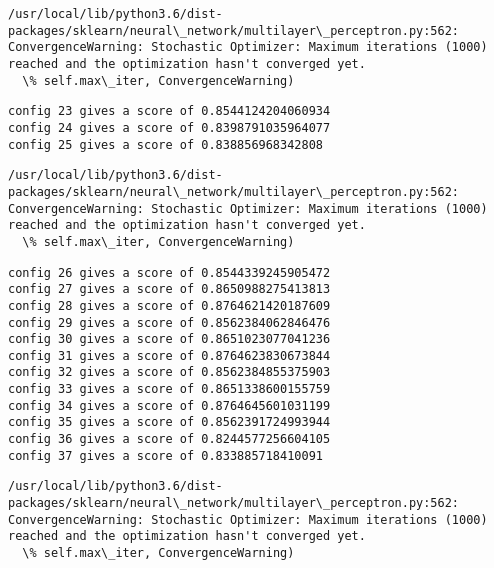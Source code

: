 \documentclass[11pt]{article}
\begin{document}
    \begin{Verbatim}[commandchars=\\\{\}]
/usr/local/lib/python3.6/dist-packages/sklearn/neural\_network/multilayer\_perceptron.py:562: ConvergenceWarning: Stochastic Optimizer: Maximum iterations (1000) reached and the optimization hasn't converged yet.
  \% self.max\_iter, ConvergenceWarning)

    \end{Verbatim}

    \begin{Verbatim}[commandchars=\\\{\}]
config 23 gives a score of 0.8544124204060934
config 24 gives a score of 0.8398791035964077
config 25 gives a score of 0.838856968342808

    \end{Verbatim}

    \begin{Verbatim}[commandchars=\\\{\}]
/usr/local/lib/python3.6/dist-packages/sklearn/neural\_network/multilayer\_perceptron.py:562: ConvergenceWarning: Stochastic Optimizer: Maximum iterations (1000) reached and the optimization hasn't converged yet.
  \% self.max\_iter, ConvergenceWarning)

    \end{Verbatim}

    \begin{Verbatim}[commandchars=\\\{\}]
config 26 gives a score of 0.8544339245905472
config 27 gives a score of 0.8650988275413813
config 28 gives a score of 0.8764621420187609
config 29 gives a score of 0.8562384062846476
config 30 gives a score of 0.8651023077041236
config 31 gives a score of 0.8764623830673844
config 32 gives a score of 0.8562384855375903
config 33 gives a score of 0.8651338600155759
config 34 gives a score of 0.8764645601031199
config 35 gives a score of 0.8562391724993944
config 36 gives a score of 0.8244577256604105
config 37 gives a score of 0.833885718410091

    \end{Verbatim}

    \begin{Verbatim}[commandchars=\\\{\}]
/usr/local/lib/python3.6/dist-packages/sklearn/neural\_network/multilayer\_perceptron.py:562: ConvergenceWarning: Stochastic Optimizer: Maximum iterations (1000) reached and the optimization hasn't converged yet.
  \% self.max\_iter, ConvergenceWarning)

    \end{Verbatim}
\end{document}
